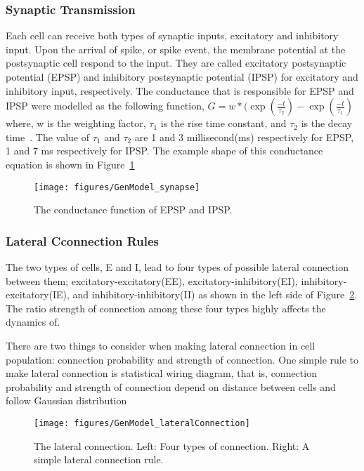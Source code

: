\subsubsection{Synaptic Transmission}
Each cell can receive both types of synaptic inputs, excitatory and inhibitory input. Upon the arrival of spike, or spike event, the membrane potential at the postsynaptic cell respond to the input. They are called excitatory postsynaptic potential (EPSP) and inhibitory postsynaptic potential (IPSP) for excitatory and inhibitory input, respectively. 
The conductance that is responsible for EPSP and IPSP were modelled as the following function,
$G = w*(\exp(\frac{-t}{\tau_2} ) - \exp(\frac{-t}{\tau_1})$
where, w is the weighting factor, $\tau_1$ is the rise time constant, and $\tau_2$ is the decay time~\cite {carnevale2006neuron}.
The value of $\tau_1$ and $\tau_2$ are 1 and 3 millisecond(ms) respectively for EPSP, 1 and 7 ms respectively for IPSP. The example shape of this conductance equation is shown in Figure~\ref{fig:GenModel_synapse}

\begin{figure}[!ht]
	\centering
	\texttt{[image: figures/GenModel\_synapse]}
	\caption{The conductance function of EPSP and IPSP.}
	\label{fig:GenModel_synapse}
\end{figure}

\subsubsection{Lateral Cconnection Rules}
The two types of cells, E and I, lead to four types of possible lateral connection between them; excitatory-excitatory(EE), excitatory-inhibitory(EI), inhibitory-excitatory(IE), and inhibitory-inhibitory(II) as shown in the left side of Figure~\ref{fig:GM_lateral}. The ratio strength of connection among these four types highly affects the dynamics of.

There are two things to consider when making lateral connection in cell population: connection probability and strength of connection. One simple rule to make lateral connection is statistical wiring diagram, that is, connection probability and strength of connection depend on distance between cells and follow Gaussian distribution~\cite{ringach2004haphazard,mclaughlin2000neuronal}

\begin{figure}
	\centering
	\texttt{[image: figures/GenModel\_lateralConnection]}
	\caption{The lateral connection. Left: Four types of connection. Right: A simple lateral connection rule.}
	\label{fig:GM_lateral}
\end{figure}

